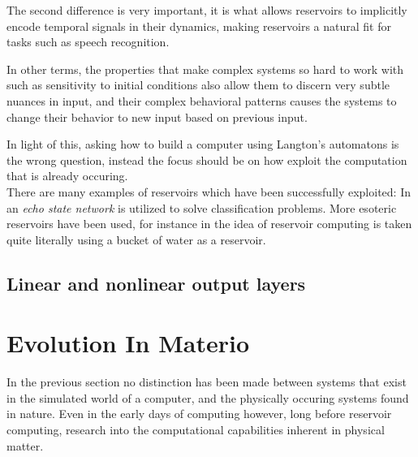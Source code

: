 The second difference is very important, it is what allows reservoirs to
implicitly encode temporal signals in their dynamics, making reservoirs a
natural fit for tasks such as speech recognition.

In other terms, the properties that make complex systems so hard to work with
such as sensitivity to initial conditions also allow them to discern very subtle
nuances in input, and their complex behavioral patterns causes the systems to
change their behavior to new input based on previous input.

In light of this, asking how to build a computer using Langton's automatons is
the wrong question, instead the focus should be on how exploit the computation
that is already occuring.\\
There are many examples of reservoirs which have been successfully exploited:
In \cite{jaeger_adaptive_2003} an \textit{echo state network} 
is utilized to solve classification problems.
More esoteric reservoirs have been used, for instance in
\cite{natschlager_liquid_2002} the idea of reservoir computing is taken quite
literally using a bucket of water as a reservoir.\\

\subsection{Linear and nonlinear output layers}

\section{Evolution In Materio}
In the previous section no distinction has been made between systems that exist
in the simulated world of a computer, and the physically occuring systems found
in nature.
Even in the early days of computing however, long before reservoir computing,
research into the computational capabilities inherent in physical matter.

